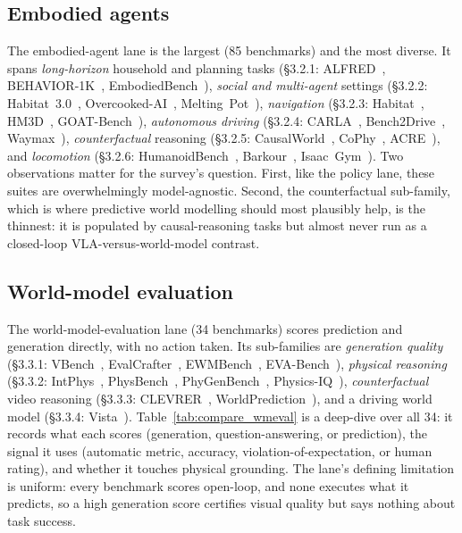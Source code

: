 

\subsection{Embodied agents}
\label{sec:lane_embodied}

The embodied-agent lane is the largest (85 benchmarks) and the most diverse. It spans
\emph{long-horizon} household and planning tasks (\S3.2.1: ALFRED~\cite{alfred},
BEHAVIOR-1K~\cite{behavior1k}, EmbodiedBench~\cite{embodiedbench}), \emph{social and multi-agent}
settings (\S3.2.2: Habitat~3.0~\cite{habitat30}, Overcooked-AI~\cite{overcookedai},
Melting~Pot~\cite{meltingpot}), \emph{navigation} (\S3.2.3: Habitat~\cite{habitat},
HM3D~\cite{hm3d}, GOAT-Bench~\cite{goatbench}), \emph{autonomous driving} (\S3.2.4:
CARLA~\cite{carla}, Bench2Drive~\cite{bench2drive}, Waymax~\cite{waymax}), \emph{counterfactual}
reasoning (\S3.2.5: CausalWorld~\cite{causalworld}, CoPhy~\cite{cophy}, ACRE~\cite{acre}), and
\emph{locomotion} (\S3.2.6: HumanoidBench~\cite{humanoidbench}, Barkour~\cite{barkour},
Isaac~Gym~\cite{isaacgym}). Two observations matter for the survey's question. First, like the policy
lane, these suites are overwhelmingly model-agnostic. Second, the counterfactual sub-family, which
is where predictive world modelling should most plausibly help, is the thinnest: it is populated by
causal-reasoning tasks but almost never run as a closed-loop VLA-versus-world-model contrast.

\subsection{World-model evaluation}
\label{sec:lane_wmeval}

The world-model-evaluation lane (34 benchmarks) scores prediction and generation directly, with no
action taken. Its sub-families are \emph{generation quality} (\S3.3.1: VBench~\cite{vbench},
EvalCrafter~\cite{evalcrafter}, EWMBench~\cite{ewmbench}, EVA-Bench~\cite{evabench}),
\emph{physical reasoning} (\S3.3.2: IntPhys~\cite{intphys}, PhysBench~\cite{physbench},
PhyGenBench~\cite{phygenbench}, Physics-IQ~\cite{physicsiq}), \emph{counterfactual} video reasoning
(\S3.3.3: CLEVRER~\cite{clevrer}, WorldPrediction~\cite{worldprediction}), and a driving world model
(\S3.3.4: Vista~\cite{vista}). Table~\ref{tab:compare_wmeval} is a deep-dive over all 34: it records
what each scores (generation, question-answering, or prediction), the signal it uses (automatic
metric, accuracy, violation-of-expectation, or human rating), and whether it touches physical
grounding. The lane's defining limitation is uniform: every benchmark scores open-loop, and none
executes what it predicts, so a high generation score certifies visual quality but says nothing about
task success.

